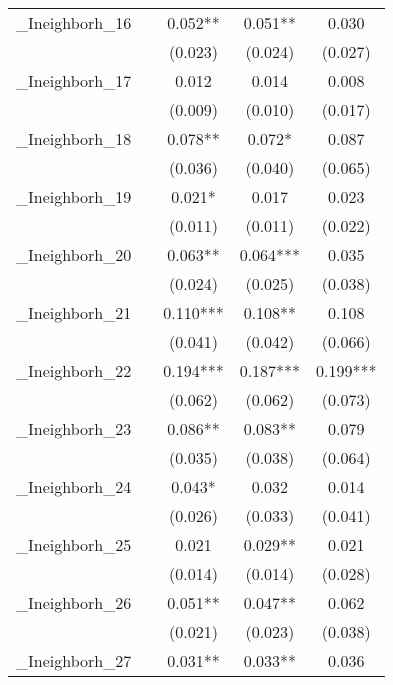 {\begin{tabular}{l*{4}{c}}
\addlinespace
\_Ineighborh\_16&            &    0.052** &    0.051** &    0.030   \\
          &            &  (0.023)   &  (0.024)   &  (0.027)   \\
\addlinespace
\_Ineighborh\_17&            &    0.012   &    0.014   &    0.008   \\
          &            &  (0.009)   &  (0.010)   &  (0.017)   \\
\addlinespace
\_Ineighborh\_18&            &    0.078** &    0.072*  &    0.087   \\
          &            &  (0.036)   &  (0.040)   &  (0.065)   \\
\addlinespace
\_Ineighborh\_19&            &    0.021*  &    0.017   &    0.023   \\
          &            &  (0.011)   &  (0.011)   &  (0.022)   \\
\addlinespace
\_Ineighborh\_20&            &    0.063** &    0.064***&    0.035   \\
          &            &  (0.024)   &  (0.025)   &  (0.038)   \\
\addlinespace
\_Ineighborh\_21&            &    0.110***&    0.108** &    0.108   \\
          &            &  (0.041)   &  (0.042)   &  (0.066)   \\
\addlinespace
\_Ineighborh\_22&            &    0.194***&    0.187***&    0.199***\\
          &            &  (0.062)   &  (0.062)   &  (0.073)   \\
\addlinespace
\_Ineighborh\_23&            &    0.086** &    0.083** &    0.079   \\
          &            &  (0.035)   &  (0.038)   &  (0.064)   \\
\addlinespace
\_Ineighborh\_24&            &    0.043*  &    0.032   &    0.014   \\
          &            &  (0.026)   &  (0.033)   &  (0.041)   \\
\addlinespace
\_Ineighborh\_25&            &    0.021   &    0.029** &    0.021   \\
          &            &  (0.014)   &  (0.014)   &  (0.028)   \\
\addlinespace
\_Ineighborh\_26&            &    0.051** &    0.047** &    0.062   \\
          &            &  (0.021)   &  (0.023)   &  (0.038)   \\
\addlinespace
\_Ineighborh\_27&            &    0.031** &    0.033** &    0.036   \\

\end{tabular}}
